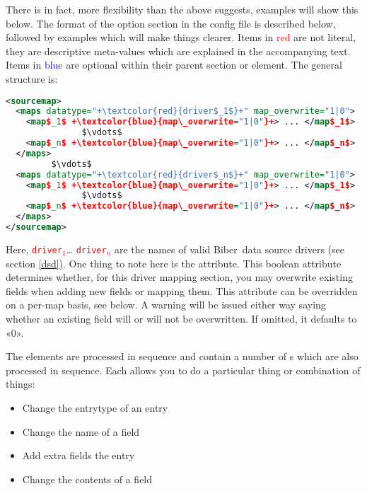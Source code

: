 \documentclass{ltxdockit}
\newcommand*{\biber}{Biber\xspace}
\begin{document}
\noindent There is in fact, more flexibility than the above suggests,
examples will show this below. The format of the  option
section in the config file is described below, followed by examples which
will make things clearer. Items in \textcolor{red}{red} are not literal,
they are descriptive meta-values which are explained in the accompanying
text. Items in \textcolor{blue}{blue} are optional within their parent
section or element. The general structure is:

\lstset{showspaces=false}
\lstset{showstringspaces=false}
\begin{lstlisting}[language=xml,escapechar=+,mathescape=true]
<sourcemap>
  <maps datatype="+\textcolor{red}{driver$_1$}+" map_overwrite="1|0">
    <map$_1$ +\textcolor{blue}{map\_overwrite="1|0"}+> ... </map$_1$>
               $\vdots$
    <map$_n$ +\textcolor{blue}{map\_overwrite="1|0"}+> ... </map$_n$>
  </maps>
         $\vdots$
  <maps datatype="+\textcolor{red}{driver$_n$}+" map_overwrite="1|0">
    <map$_1$ +\textcolor{blue}{map\_overwrite="1|0"}+> ... </map$_1$>
               $\vdots$
    <map$_n$ +\textcolor{blue}{map\_overwrite="1|0"}+> ... </map$_n$>
  </maps>
</sourcemap>
\end{lstlisting}

\noindent Here, \textcolor{red}{\texttt{driver$_1$}}\ldots
\textcolor{red}{\texttt{driver$_n$}} are the names of valid \biber\ data
source drivers (see section \ref{dsd}). One thing to note here is the
 attribute. This boolean attribute determines whether,
for this driver mapping section, you may overwrite existing fields when
adding new fields or mapping them. This attribute can be overridden on a
per-map basis, see below. A warning will be issued either way saying
whether an existing field will or will not be overwritten. If omitted, it
defaults to «0».

The  elements are processed in sequence and contain a number of
s which are also processed in sequence. Each 
allows you to do a particular thing or combination of things:

\begin{itemize}
\item Change the entrytype of an entry
\item Change the name of a field
\item Add extra fields the entry
\item Change the contents of a field
\end{itemize}
\end{document}
